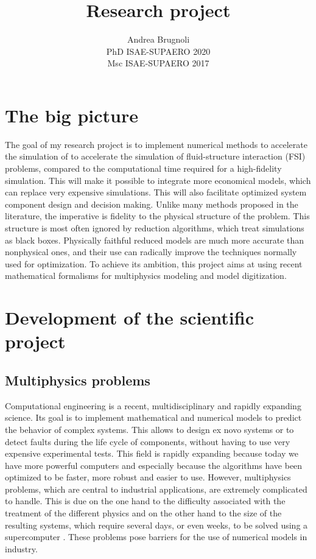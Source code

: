 \documentclass[12pt]{article}
\author{Andrea Brugnoli \\ 
	\hspace{2.8pt} PhD ISAE-SUPAERO 2020\\
	Msc ISAE-SUPAERO 2017}
\title{Research project}
\date{}
\begin{document}
	
	\maketitle
	
	\tableofcontents

	
	
	\section{The big picture}
	
	The goal of my research project is to implement numerical methods to accelerate the simulation of
	to accelerate the simulation of fluid-structure interaction (FSI) problems, compared to the computational time required for a high-fidelity simulation. This will make it possible to integrate more economical models, which can replace very expensive simulations. This will also facilitate optimized system component design and decision making. Unlike many methods proposed in the literature, the imperative is fidelity to the physical structure of the problem.  This structure is most often ignored by reduction algorithms, which treat simulations as black boxes. Physically faithful reduced models are much more accurate than nonphysical ones, and their use can radically improve the techniques normally used for optimization. To achieve its ambition, this project aims at using recent mathematical formalisms for multiphysics modeling and model digitization.
	
	
	\section{Development of the scientific project}
	
	\subsection{Multiphysics problems}
	Computational engineering is a recent, multidisciplinary and rapidly expanding science. Its goal is to implement mathematical and numerical models to predict the behavior of complex systems. This allows to design ex novo systems or to detect faults during the life cycle of components, without having to use very expensive experimental tests. This field is rapidly expanding because today we have more powerful computers and especially because the algorithms have been optimized to be faster, more robust and easier to use. However, multiphysics problems, which are central to industrial applications, are extremely complicated to handle. This is due on the one hand to the difficulty associated with the treatment of the different physics and on the other hand to the size of the resulting systems, which require several days, or even weeks, to be solved using a supercomputer \cite{keyes2013}. These problems pose barriers for the use of numerical models in industry. 
	
\end{document}
